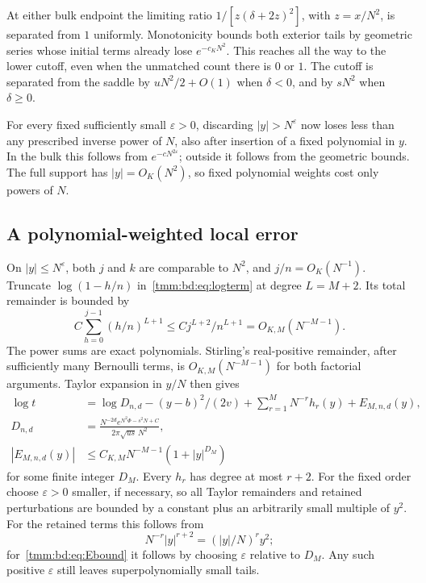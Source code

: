 \documentclass[11pt,letterpaper]{article}
\theoremstyle{remark}\newtheorem{remark}[theorem]{Remark}
\begin{document}
At either bulk endpoint the limiting ratio $1/[z(\delta+2z)^2]$, with $z=x/N^2$, is separated from $1$ uniformly. Monotonicity bounds both exterior tails by geometric series whose initial terms already lose $e^{-c_KN^2}$. This reaches all the way to the lower cutoff, even when the unmatched count there is $0$ or $1$. The cutoff is separated from the saddle by $uN^2/2+O(1)$ when $\delta<0$, and by $sN^2$ when $\delta\ge0$.

For every fixed sufficiently small $\varepsilon>0$, discarding $|y|>N^\varepsilon$ now loses less than any prescribed inverse power of $N$, also after insertion of a fixed polynomial in $y$. In the bulk this follows from $e^{-cN^{2\varepsilon}}$; outside it follows from the geometric bounds. The full support has $|y|=O_K(N^2)$, so fixed polynomial weights cost only powers of $N$.

\subsection{A polynomial-weighted local error}
On $|y|\le N^\varepsilon$, both $j$ and $k$ are comparable to $N^2$, and $j/n=O_K(N^{-1})$. Truncate $\log(1-h/n)$ in~\eqref{tmm:bd:eq:logterm} at degree $L=M+2$. Its total remainder is bounded by
\[
 C\sum_{h=0}^{j-1}(h/n)^{L+1}
 \le Cj^{L+2}/n^{L+1}=O_{K,M}(N^{-M-1}).
\]
The power sums are exact polynomials. Stirling's real-positive remainder, after sufficiently many Bernoulli terms, is $O_{K,M}(N^{-M-1})$ for both factorial arguments. Taylor expansion in $y/N$ then gives
\begin{align}
 \log t&=\log D_{n,d}-(y-b)^2/(2v)
           +\sum_{r=1}^MN^{-r}h_r(y)+E_{M,n,d}(y),\label{tmm:bd:eq:E}\\
 D_{n,d}&=\frac{N^{-2d}e^{N^2\Phi-s^2N+C}}{2\pi\sqrt{us}\,N^2},\label{tmm:bd:eq:D}\\
 |E_{M,n,d}(y)|&\le C_{K,M}N^{-M-1}(1+|y|^{D_M})\label{tmm:bd:eq:Ebound}
\end{align}
for some finite integer $D_M$. Every $h_r$ has degree at most $r+2$. For the fixed order choose $\varepsilon>0$ smaller, if necessary, so all Taylor remainders and retained perturbations are bounded by a constant plus an arbitrarily small multiple of $y^2$. For the retained terms this follows from
\[
 N^{-r}|y|^{r+2}=(|y|/N)^r y^2;
\]
for~\eqref{tmm:bd:eq:Ebound} it follows by choosing $\varepsilon$ relative to $D_M$. Any such positive $\varepsilon$ still leaves superpolynomially small tails.
\end{document}
